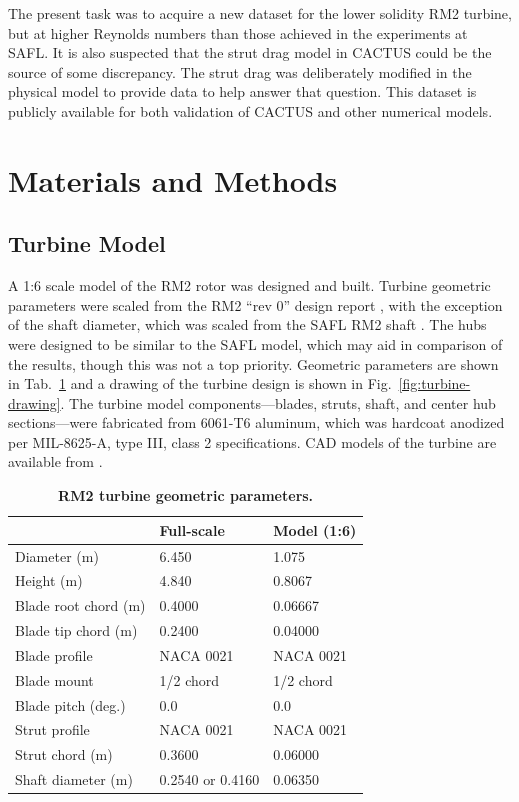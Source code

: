 \documentclass[10pt,letterpaper]{article}
\begin{document}
The present task was to acquire a new dataset for the lower solidity RM2
turbine, but at higher Reynolds numbers than those achieved in the experiments
at SAFL. It is also suspected that the strut drag model in CACTUS could be the
source of some discrepancy. The strut drag was deliberately modified in the
physical model to provide data to help answer that question. This dataset is
publicly available for both validation of CACTUS and other numerical models.


\section*{Materials and Methods}

\subsection*{Turbine Model}

A 1:6 scale model of the RM2 rotor was designed and built. Turbine geometric
parameters were scaled from the RM2 ``rev 0'' design report \cite{Barone2011},
with the exception of the shaft diameter, which was scaled from the SAFL RM2
shaft \cite{Hill2014}. The hubs were designed to be similar to the SAFL model,
which may aid in comparison of the results, though this was not a top priority.
Geometric parameters are shown in Tab.~\ref{tab:turb-geom} and a drawing of the
turbine design is shown in Fig.~\ref{fig:turbine-drawing}. The turbine model
components---blades, struts, shaft, and center hub sections---were fabricated
from 6061-T6 aluminum, which was hardcoat anodized per MIL-8625-A, type III,
class 2 specifications. CAD models of the turbine are available from
\cite{Bachant2015-RM2-CAD}.

\begin{table}[ht]
\centering
\begin{tabular}{l|l|l}
   & Full-scale & Model (1:6) \\
\hline 
Diameter (m)   & 6.450 & 1.075 \\ 
Height (m)     & 4.840 & 0.8067 \\ 
Blade root chord (m) & 0.4000 & 0.06667 \\ 
Blade tip chord (m)  & 0.2400 & 0.04000 \\ 
Blade profile & NACA 0021 & NACA 0021 \\ 
Blade mount & 1/2 chord & 1/2 chord \\ 
Blade pitch (deg.) & 0.0 & 0.0 \\ 
Strut profile & NACA 0021 & NACA 0021 \\ 
Strut chord (m) & 0.3600 & 0.06000 \\ 
Shaft diameter (m) & 0.2540 \cite{Beam2011} or 0.4160 \cite{Hill2014} & 0.06350\\ 
\end{tabular}
\caption{\textbf{RM2 turbine geometric parameters.}}
\label{tab:turb-geom}
\end{table}
\end{document}

